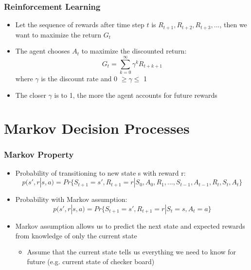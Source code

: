 \documentclass{beamer}
\begin{document}

\begin{frame}
\frametitle{Reinforcement Learning}
\begin{itemize}
\item Let the sequence of rewards after time step $t$ is $R_{t+1}, R_{t+2}, R_{t+3},...$, then we want to maximize the return $G_t$
\item The agent chooses $A_t$ to maximize the discounted return: 
\begin{equation}
G_t = \sum_{k=0}^{\infty} \gamma^k R_{t+k+1}
\nonumber
\end{equation}
where $\gamma$ is the discount rate and 0 $\geq \gamma \leq$ 1
\item The closer $\gamma$ is to 1, the more the agent accounts for future rewards
\end{itemize}
\end{frame}

\section{Markov Decision Processes} %


\begin{frame}
\frametitle{Markov Property}
\begin{itemize}
\item Probability of transitioning to new state s with reward r:
\small
\begin{equation}
p(s',r | s,a)=Pr\{S_{t+1}=s', R_{t+1}=r|S_0, A_0, R_1,...,S_{t-1},A_{t-1},R_t, S_t, A_t\}
\nonumber
\end{equation}
\normalsize
\item Probability with Markov assumption:
\begin{equation}
p(s',r | s,a) = Pr\{S_{t+1} = s', R_{t+1} = r | S_t = s, A_t = a\}
\nonumber
\end{equation}
\item Markov assumption allows us to predict the next state and expected rewards from knowledge of only the current state
   \begin{itemize}
   	\item Assume that the current state tells us everything we need to know for future (e.g. current state of checker board)
      \end{itemize}
\end{itemize}
\end{frame}
\end{document}
